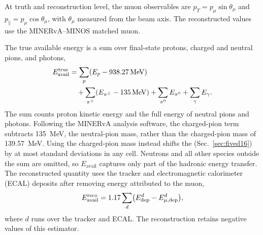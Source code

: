 At truth and reconstruction level, the muon observables are $p_T=p_\mu\sin\theta_\mu$ and $p_\parallel=p_\mu\allowbreak\cos\theta_\mu$, with $\theta_\mu$ measured from the beam axis. The reconstructed values use the MINERvA--MINOS matched muon.

\label{sec:3d-method}
\label{sec:eavail-definition}
The true available energy is a sum over final-state protons, charged and neutral pions, and photons,
\begin{equation}
  \begin{aligned}[b]
    E_{\mathrm{avail}}^{\mathrm{true}}
    &= \sum_p (E_p-938.27\,\mathrm{MeV})\\
    &\quad + \sum_{\pi^\pm}(E_{\pi^\pm}-135\,\mathrm{MeV})
           + \sum_{\pi^0} E_{\pi^0} + \sum_\gamma E_\gamma .
  \end{aligned}
  \label{eq:available-energy-true}
  \csname ltx@label\endcsname{eq:eavail-implemented}
\end{equation}
The sum counts proton kinetic energy and the full energy of neutral pions and photons. Following the MINERvA analysis software, the charged-pion term subtracts \SI{135}{MeV}, the neutral-pion mass, rather than the charged-pion mass of \SI{139.57}{MeV}. Using the charged-pion mass instead shifts the \resSixteen{} (Sec.~\ref{sec:fived16}) by at most  standard deviations in any cell. Neutrons and all other species outside the sum are omitted, so $E_{\mathrm{avail}}$ captures only part of the hadronic energy transfer. The reconstructed quantity uses the tracker and electromagnetic calorimeter (ECAL) deposits after removing energy attributed to the muon,
\begin{equation}
  E_{\mathrm{avail}}^{\mathrm{reco}} =
  1.17 \sum_d \bigl(E_{\mathrm{dep}}^d-E_{\mu,\mathrm{dep}}^d\bigr),
  \label{eq:available-energy-reco}
  \csname ltx@label\endcsname{eq:eavail-reco-implemented}
\end{equation}
where $d$ runs over the tracker and ECAL. The reconstruction retains negative values of this estimator.

